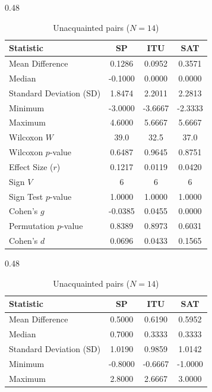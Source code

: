 \documentclass[a4paper,fleqn]{cas-sc}
\begin{document}
\begin{table}[t]
\centering
\caption{Subjective evaluation of AI NPC personality by pair acquaintance.}
\label{tab:pair_acquaintance_construct_results}

\begin{subtable}[t]{0.48\textwidth}
\centering
\caption{Acquainted pairs ($N = 14$)}
\label{tab:acquainted_construct_results}
\begin{tabular}{lccc}
\toprule
\textbf{Statistic} & \textbf{SP} & \textbf{ITU} & \textbf{SAT} \\
\midrule
Mean Difference & 0.1286 & 0.0952 & 0.3571 \\
Median & -0.1000 & 0.0000 & 0.0000 \\
Standard Deviation (SD) & 1.8474 & 2.2011 & 2.2813 \\
Minimum & -3.0000 & -3.6667 & -2.3333 \\
Maximum & 4.6000 & 5.6667 & 5.6667 \\
\midrule
Wilcoxon $W$ & 39.0 & 32.5 & 37.0 \\
Wilcoxon $p$-value & 0.6487 & 0.9645 & 0.8751 \\
Effect Size ($r$) & 0.1217 & 0.0119 & 0.0420 \\
\midrule
Sign $V$ & 6 & 6 & 6 \\
Sign Test $p$-value & 1.0000 & 1.0000 & 1.0000 \\
Cohen's $g$ & -0.0385 & 0.0455 & 0.0000 \\
\midrule
Permutation $p$-value & 0.8389 & 0.8973 & 0.6031 \\
Cohen's $d$ & 0.0696 & 0.0433 & 0.1565 \\
\bottomrule
\end{tabular}
\end{subtable}
\hfill
\begin{subtable}[t]{0.48\textwidth}
\centering
\caption{Unacquainted pairs ($N = 14$)}
\label{tab:unacquainted_construct_results}
\begin{tabular}{lccc}
\toprule
\textbf{Statistic} & \textbf{SP} & \textbf{ITU} & \textbf{SAT} \\
\midrule
Mean Difference & 0.5000 & 0.6190 & 0.5952 \\
Median & 0.7000 & 0.3333 & 0.3333 \\
Standard Deviation (SD) & 1.0190 & 0.9859 & 1.0142 \\
Minimum & -0.8000 & -0.6667 & -1.0000 \\
Maximum & 2.8000 & 2.6667 & 3.0000 \\
\midrule

\end{tabular}
\end{subtable}
\end{table}
\end{document}
